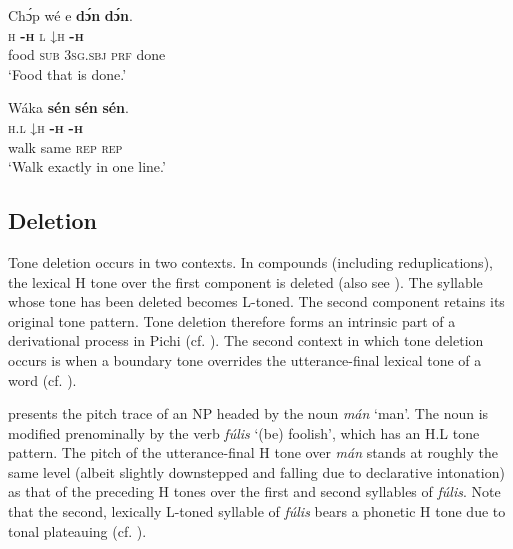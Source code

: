 \clearpage 
\ea\label{ex:key:56}
\glll Chɔ́p  wé  e    \textbf{dɔ́n}  \textbf{dɔ́n}.\\
\textsc{h}    \textbf{\textsc{{}-h}}  \textsc{l}    \textsc{↓}\textsc{h}  \textbf{\textsc{{}-h}} \\
food    \textsc{sub}  \textsc{3sg.sbj}  \textsc{prf}  done\\
\glt ‘Food that is done.’
\z

\ea\label{ex:key:57}
\glll   Wáka  \textbf{sén}    \textbf{sén}    \textbf{sén}.\\
\textsc{h.l}    \textsc{↓}\textsc{h}    \textbf{\textsc{{}-h}}    \textbf{\textsc{{}-h}}\\
walk  same  \textsc{rep}    \textsc{rep}\\
\glt ‘Walk exactly in one line.’
\z

\subsection{Deletion}\label{sec:3.2.4}

Tone deletion occurs in two contexts. In compounds (including reduplications), the lexical H tone over the first component is deleted (also see \citealt{Yakpo2012}). The syllable whose tone has been deleted becomes L-toned. The second component retains its original tone pattern. Tone deletion therefore forms an intrinsic part of a derivational process in Pichi (cf. ). The second context in which tone deletion occurs is when a boundary tone overrides the utterance-final lexical tone of a word (cf. ).

 presents the pitch trace of an NP headed by the noun \textit{mán} ‘man’. The noun is modified prenominally by the verb \textit{fúlis} ‘(be) foolish’, which has an H.L tone pattern. The pitch of the utterance-final H tone over \textit{mán} stands at roughly the same level (albeit slightly downstepped and falling due to declarative intonation) as that of the preceding H tones over the first and second syllables of \textit{fúlis}. Note that the second, lexically L-toned syllable of \textit{fúlis} bears a phonetic H tone due to tonal plateauing (cf. ).

